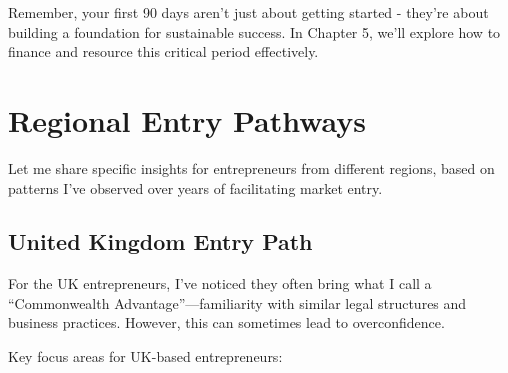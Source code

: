 \begin{importantbox}
Remember, your first 90 days aren't just about getting started - they're about building a foundation for sustainable success. In Chapter 5, we'll explore how to finance and resource this critical period effectively.
\end{importantbox}
\section{Regional Entry Pathways}\label{sec:regional-entry-pathways}

Let me share specific insights for entrepreneurs from different regions, based on patterns I've observed over years of facilitating market entry.

\subsection{United Kingdom Entry Path}\label{subsec:united-kingdom-entry-path}

For the UK entrepreneurs, I've noticed they often bring what I call a ``Commonwealth Advantage''—familiarity with similar legal structures and business practices. However, this can sometimes lead to overconfidence.

Key focus areas for UK-based entrepreneurs:

